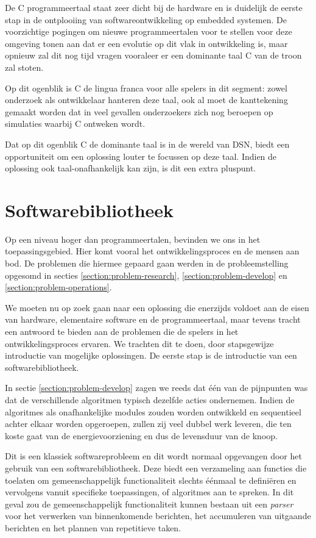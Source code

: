 De C programmeertaal staat zeer dicht bij de hardware en is duidelijk de eerste
stap in de ontplooiing van softwareontwikkeling op embedded systemen. De
voorzichtige pogingen om nieuwe programmeertalen voor te stellen voor deze
omgeving tonen aan dat er een evolutie op dit vlak in ontwikkeling is, maar
opnieuw zal dit nog tijd vragen vooraleer er een dominante taal C van de troon
zal stoten.

Op dit ogenblik is C de lingua franca voor alle spelers in dit segment: zowel
onderzoek als ontwikkelaar hanteren deze taal, ook al moet de kanttekening
gemaakt worden dat in veel gevallen onderzoekers zich nog beroepen op
simulaties waarbij C ontweken wordt.

Dat op dit ogenblik C de dominante taal is in de wereld van DSN, biedt een
opportuniteit om een oplossing louter te focussen op deze taal. Indien de
oplossing ook taal-onafhankelijk kan zijn, is dit een extra pluspunt.

\section{Softwarebibliotheek}
\label{section:solution-library}

Op een niveau hoger dan programmeertalen, bevinden we ons in het
toepassingsgebied. Hier komt vooral het ontwikkelingsproces en de mensen aan
bod. De problemen die hiermee gepaard gaan werden in de probleemstelling
opgesomd in secties \ref{section:problem-research},
\ref{section:problem-develop} en \ref{section:problem-operations}.

We moeten nu op zoek gaan naar een oplossing die enerzijds voldoet aan de eisen
van hardware, elementaire software en de programmeertaal, maar tevens tracht
een antwoord te bieden aan de problemen die de spelers in het
ontwikkelingsproces ervaren. We trachten dit te doen, door stapsgewijze
introductie van mogelijke oplossingen. De eerste stap is de introductie van een
softwarebibliotheek.
 
In sectie \ref{section:problem-develop} zagen we reeds dat \'e\'en van de
pijnpunten was dat de verschillende algoritmen typisch dezelfde acties
ondernemen. Indien de algoritmes als onafhankelijke modules zouden worden
ontwikkeld en sequentieel achter elkaar worden opgeroepen, zullen zij veel
dubbel werk leveren, die ten koste gaat van de energievoorziening en dus de
levensduur van de knoop.

Dit is een klassiek softwareprobleem en dit wordt normaal opgevangen door het
gebruik van een softwarebibliotheek. Deze biedt een verzameling aan functies
die toelaten om gemeenschappelijk functionaliteit slechts \'e\'enmaal te
defini\"eren en vervolgens vanuit specifieke toepassingen, of algoritmes aan te
spreken. In dit geval zou de gemeenschappelijk functionaliteit kunnen bestaan
uit een \emph{parser} voor het verwerken van binnenkomende berichten, het
accumuleren van uitgaande berichten en het plannen van repetitieve taken.

